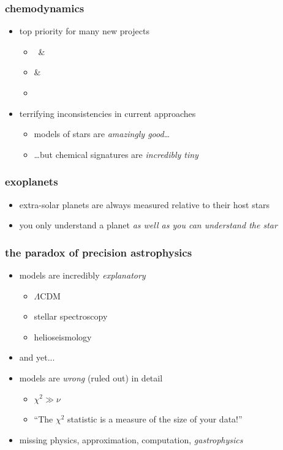 \documentclass[pdftex]{beamer}
\begin{document}
\begin{frame}
  \frametitle{chemodynamics}
  \begin{itemize}
  \item top priority for many new projects
    \begin{itemize}
    \item \gaia\ \& 
    \item {} \& 
    \item \sdssiii\ \apogee
    \end{itemize}
  \item terrifying inconsistencies in current approaches
    \begin{itemize}
    \item models of stars are \emph{amazingly good}\ldots
    \item \ldots but chemical signatures are \emph{incredibly tiny}
    \end{itemize}
  \end{itemize}
\end{frame}

\begin{frame}
  \frametitle{exoplanets}
  \begin{itemize}
  \item extra-solar planets are always measured relative to their host stars
  \item you only understand a planet \emph{as well as you can understand the star}
  \end{itemize}
\end{frame}

\begin{frame}
  \frametitle{the paradox of precision astrophysics}
  \begin{itemize}
  \item models are incredibly \emph{explanatory}
    \begin{itemize}
    \item $\Lambda$CDM
    \item stellar spectroscopy
    \item helioseismology
    \end{itemize}
  \item and yet...
  \item<2-> models are \emph{wrong} (ruled out) in detail
    \begin{itemize}
    \item $\chi^2 \gg \nu$
    \item ``The $\chi^2$ statistic is a measure of the size of your data!''
    \end{itemize}
  \item<2-> missing physics, approximation, computation, \emph{gastrophysics}
  \end{itemize}
\end{frame}
\end{document}
